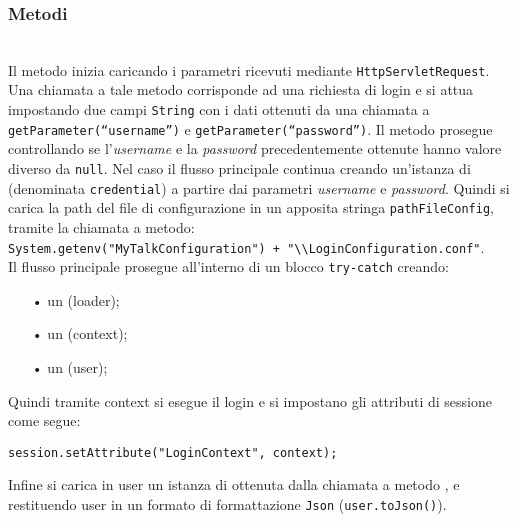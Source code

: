 \subsubsection*{Metodi}
\begin{description}
	\item{}\\

Il metodo inizia caricando i parametri ricevuti mediante \texttt{HttpServletRequest}. Una chiamata a tale metodo corrisponde ad una richiesta di login e si attua impostando due campi \texttt{String} con i dati ottenuti da una chiamata a \texttt{getParameter(``username'')} e \texttt{getParameter(``password'')}. Il metodo prosegue controllando se l'\textit{username} e la \textit{password} precedentemente ottenute hanno valore diverso da \texttt{null}. Nel caso il flusso principale continua creando un'istanza di  (denominata \texttt{credential}) a partire dai parametri \textit{username} e \textit{password}. Quindi si carica la path del file di configurazione in un apposita stringa \texttt{pathFileConfig}, tramite la chiamata a metodo:\\
	
\verb|System.getenv("MyTalkConfiguration") + "\\LoginConfiguration.conf"|.\\

Il flusso principale prosegue all'interno di un blocco \texttt{try-catch} creando:
	\begin{itemize}
		\item[•] un  (loader);
		\item[•] un  (context);
		\item[•] un  (user);
	\end{itemize}
Quindi tramite context si esegue il login e si impostano gli attributi di sessione come segue: 

\texttt{session.setAttribute("LoginContext", context);}

Infine si carica in user un istanza di  ottenuta dalla chiamata a metodo , e restituendo user in un formato di formattazione \texttt{Json} (\texttt{user.toJson()}).

\end{description}


